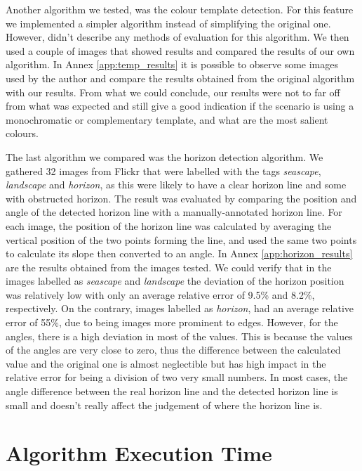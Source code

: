 Another algorithm we tested, was the colour template detection. For this feature we implemented a simpler algorithm instead of simplifying the original one. However, \citeauthor{cohen2006color} \cite{cohen2006color} didn't describe any methods of evaluation for this algorithm. We then used a couple of images that showed results and compared the results of our own algorithm. In Annex \ref{app:temp_results} it is possible to observe some images used by the author and compare the results obtained from the original algorithm with our results. From what we could conclude, our results were not to far off from what was expected and still give a good indication if the scenario is using a monochromatic or complementary template, and what are the most salient colours.


The last algorithm we compared was the horizon detection algorithm. We gathered 32 images from Flickr that were labelled with the tags \emph{seascape}, \emph{landscape} and \emph{horizon}, as this were likely to have a clear horizon line and some with obstructed horizon. The result was evaluated by comparing the position and angle of the detected horizon line with a manually-annotated horizon line. For each image, the position of the horizon line was calculated by averaging the vertical position of the two points forming the line, and used the same two points to calculate its slope then converted to an angle. In Annex \ref{app:horizon_results} are the results obtained from the images tested. We could verify that in the images labelled as \emph{seascape} and \emph{landscape} the deviation of the horizon position was relatively low with only an average relative error of 9.5\% and 8.2\%, respectively. On the contrary, images labelled as \emph{horizon}, had an average relative error of 55\%, due to being images more prominent to edges. However, for the angles, there is a high deviation in most of the values. This is because the values of the angles are very close to zero, thus the difference between the calculated value and the original one is almost neglectible but has high impact in the relative error for being a division of two very small numbers. In most cases, the angle difference between the real horizon line and the detected horizon line is small and doesn't really affect the judgement of where the horizon line is.

\section{Algorithm Execution Time}

